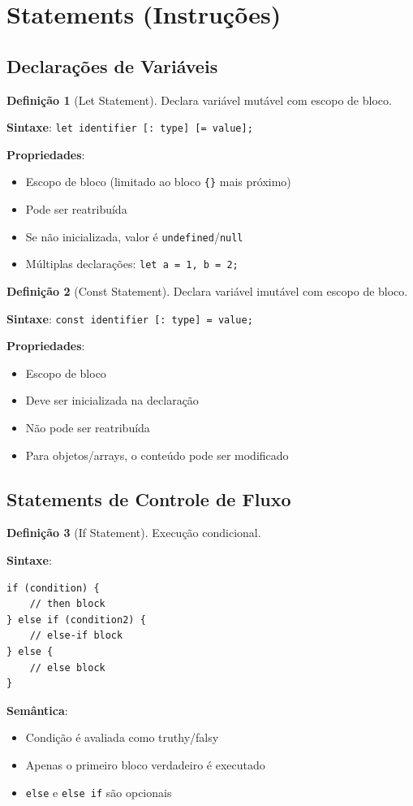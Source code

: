 \documentclass[12pt,a4paper]{article}
\theoremstyle{definition}
\newtheorem{definition}{Definição}[section]
\begin{document}
\section{Statements (Instruções)}

\subsection{Declarações de Variáveis}

\begin{definition}[Let Statement]
Declara variável mutável com escopo de bloco.

\textbf{Sintaxe}: \texttt{let identifier [: type] [= value];}

\textbf{Propriedades}:
\begin{itemize}
    \item Escopo de bloco (limitado ao bloco \texttt{\{\}} mais próximo)
    \item Pode ser reatribuída
    \item Se não inicializada, valor é \texttt{undefined}/\texttt{null}
    \item Múltiplas declarações: \texttt{let a = 1, b = 2;}
\end{itemize}
\end{definition}

\begin{definition}[Const Statement]
Declara variável imutável com escopo de bloco.

\textbf{Sintaxe}: \texttt{const identifier [: type] = value;}

\textbf{Propriedades}:
\begin{itemize}
    \item Escopo de bloco
    \item Deve ser inicializada na declaração
    \item Não pode ser reatribuída
    \item Para objetos/arrays, o conteúdo pode ser modificado
\end{itemize}
\end{definition}

\subsection{Statements de Controle de Fluxo}

\begin{definition}[If Statement]
Execução condicional.

\textbf{Sintaxe}:
\begin{verbatim}
if (condition) {
    // then block
} else if (condition2) {
    // else-if block
} else {
    // else block
}
\end{verbatim}

\textbf{Semântica}:
\begin{itemize}
    \item Condição é avaliada como truthy/falsy
    \item Apenas o primeiro bloco verdadeiro é executado
    \item \texttt{else} e \texttt{else if} são opcionais
\end{itemize}
\end{definition}
\end{document}
